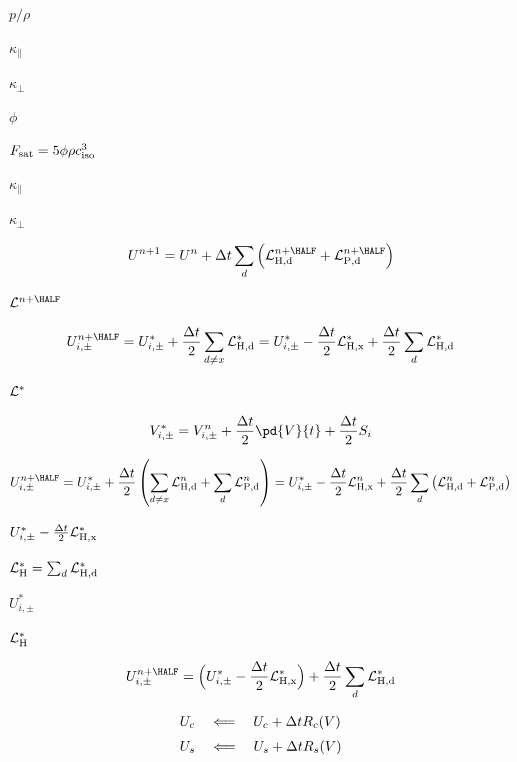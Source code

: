 \documentclass{article}
\begin{document}
$p/\rho$
\pagebreak

$\kappa_\| $
\pagebreak

$ \kappa_\bot $
\pagebreak

$ \phi $
\pagebreak

$ F_{\rm sat} = 5\phi\rho c_{\rm iso}^3 $
\pagebreak

$ \kappa_\parallel $
\pagebreak

$ \kappa_\perp $
\pagebreak

\[   U^{n+1} = U^{n} + \Delta t\sum_d\Big({\cal L}^{n+\HALF}_{\rm H,d}
                                      + {\cal L}^{n+\HALF}_{\rm P,d}\Big)
\]
\pagebreak

${\cal L}^{n+\HALF}$
\pagebreak

\[   U^{n+\HALF}_{i,\pm} = U^*_{i,\pm} + \frac{\Delta t}{2}\sum_{d \neq x}{\cal L}^*_{\rm H,d}
                       = U^*_{i,\pm} - \frac{\Delta t}{2}{\cal L}^*_{\rm H,x} +
                        \frac{\Delta t}{2}\sum_d {\cal L}^*_{\rm H,d}
\]
\pagebreak

${\cal L}^*$
\pagebreak

\[    V^{*}_{i,\pm} = V^n_{i,\pm} + \frac{\Delta t}{2}\pd{V}{t}
                                + \frac{\Delta t}{2}S_i
\]
\pagebreak

\[   U^{n+\HALF}_{i,\pm} = U^*_{i,\pm} + \frac{\Delta t}{2}\left(
                         \sum_{d\neq x}{\cal L}^n_{\rm H,d}
                        + \sum_{d}{\cal L}^n_{\rm P,d}\right)
                       = U^*_{i,\pm} - \frac{\Delta t}{2}{\cal L}^n_{\rm H,x} +
                         \frac{\Delta t}{2}\sum_d\left( {\cal L}^n_{\rm H,d}
                         + {\cal L}^n_{\rm P,d}\right)
\]
\pagebreak

$ U^*_{i,\pm} - \frac{\Delta t}{2}{\cal L}^*_{\rm H,x} $
\pagebreak

${\cal L}^*_{\rm H} = \sum_d{\cal L}^*_{\rm H,d}$
\pagebreak

$U^*_{i,\pm}$
\pagebreak

${\cal L}^*_{\rm H}$
\pagebreak

\[        U^{n+\HALF}_{i,\pm} =
          \Big(U^*_{i,\pm} - \frac{\Delta t}{2}{\cal L}^*_{\rm H,x}\Big)
         + \frac{\Delta t}{2}\sum_d {\cal L}^*_{\rm H,d}
\]
\pagebreak

\[   \begin{array}{l}
    U_c \quad\Longleftarrow \quad  U_c + \Delta t R_c(V) \\ \noalign{\medskip}
    U_s \quad\Longleftarrow \quad  U_s + \Delta t R_s(V)
   \end{array}
\]
\pagebreak
\end{document}
